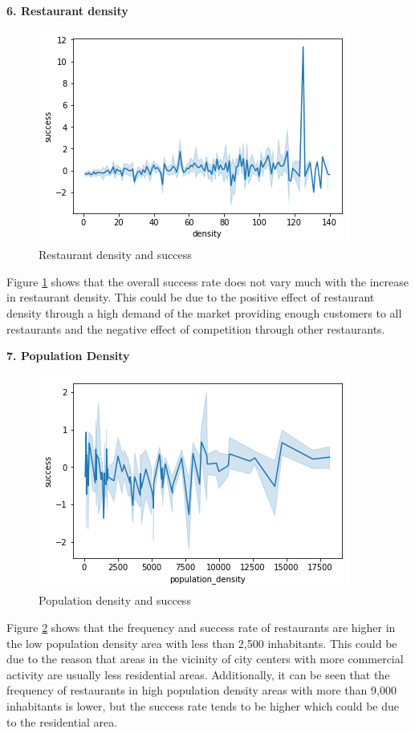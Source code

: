 \documentclass[a4paper, 11pt, oneside]{Thesis}  %
\begin{document}
\textbf{6.	Restaurant density}
 
\begin{figure}[h]
\includegraphics[scale=0.7]{Figures/Exploratory/lineplot_restaurant_densities.png}
\centering
\caption{Restaurant density and success}
\label{fig:lineplot_restaurant_densities}
\end{figure}

Figure \ref{fig:lineplot_restaurant_densities} shows that the overall success rate does not vary much with the increase in restaurant density. This could be due to the positive effect of restaurant density through a high demand of the market providing enough customers to all restaurants and the negative effect of competition through other restaurants.

\textbf{7.	Population Density}
 
\begin{figure}[h]
\includegraphics[scale=0.7]{Figures/Exploratory/lineplot_population_density.png}
\centering
\caption{Population density and success}
\label{fig:lineplot_population_density}
\end{figure}

Figure \ref{fig:lineplot_population_density} shows that the frequency and success rate of restaurants are higher in the low population density area with less than 2,500 inhabitants. This could be due to the reason that areas in the vicinity of city centers with more commercial activity are usually less residential areas. Additionally, it can be seen that the frequency of restaurants in high population density areas with more than 9,000 inhabitants is lower, but the success rate tends to be higher which could be due to the residential area.
\end{document}

